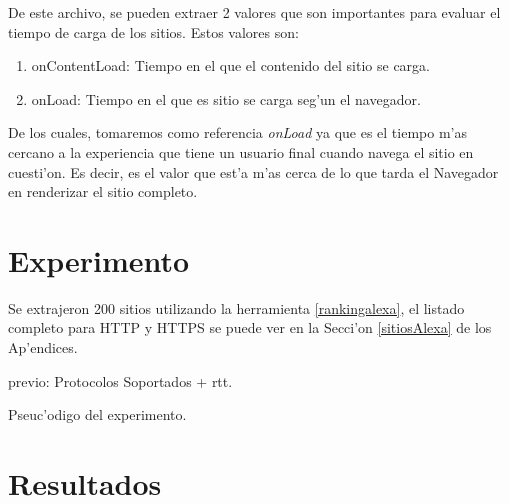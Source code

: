 De este archivo, se pueden extraer 2 valores que son importantes para evaluar el tiempo de carga de los sitios. Estos valores son:
\begin{enumerate}
\item onContentLoad: Tiempo en el que el contenido del sitio se carga.
\item onLoad: Tiempo en el que es sitio se carga seg'un el navegador.
\end{enumerate}

De los cuales, tomaremos como referencia \emph{onLoad} ya que es el tiempo m'as cercano a la experiencia que tiene un usuario final cuando navega el sitio en cuesti'on. Es decir, es el valor que est'a m'as cerca de lo que tarda el Navegador en renderizar el sitio completo.

\section{Experimento}

Se extrajeron 200 sitios utilizando la herramienta \ref{rankingalexa}, el listado completo para HTTP y HTTPS se puede ver en la Secci'on \ref{sitiosAlexa} de los Ap'endices.

previo: Protocolos Soportados + rtt.

Pseuc'odigo del experimento.

\section{Resultados}